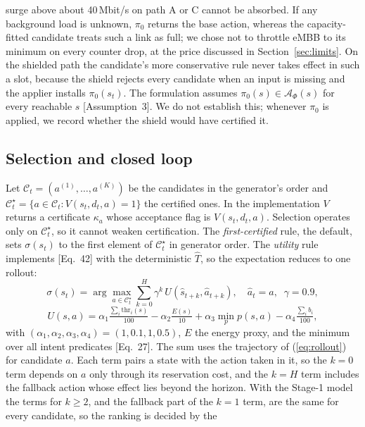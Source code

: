 \documentclass[conference]{IEEEtran}
\newcommand{\That}{\hat{T}}
\newcommand{\shat}{\hat{s}}
\newcommand{\ahat}{\hat{a}}
\newcommand{\Acal}{\mathcal{A}}
\newcommand{\Ccal}{\mathcal{C}}
\begin{document}
surge above about 40\,Mbit/s on path A or C cannot be absorbed. If any background load
is unknown, $\pi_0$ returns the base action, whereas the capacity-fitted candidate
treats such a link as full; we chose not to throttle eMBB to its minimum on every
counter drop, at the price discussed in Section~\ref{sec:limits}. On the shielded path
the candidate's more conservative rule never takes effect in such a slot, because
the shield rejects every candidate when an input is missing and the applier installs
$\pi_0(s_t)$. The formulation assumes $\pi_0(s) \in \Acal_\Phi(s)$ for every
reachable $s$ [Assumption~3]. We do not establish this; whenever $\pi_0$ is applied,
we record whether the shield would have certified it.

\subsection{Selection and closed loop}
Let $\Ccal_t = (a^{(1)},\dots,a^{(K)})$ be the candidates in the generator's order
and $\Ccal^\star_t = \{a\in\Ccal_t : V(s_t,d_t,a)=1\}$ the certified ones. In the implementation $V$ returns a certificate $\kappa_a$ whose acceptance flag is
$V(s_t,d_t,a)$. Selection operates only on $\Ccal^\star_t$, so it cannot weaken
certification. The \emph{first-certified} rule, the default, sets $\sigma(s_t)$ to the first
element of $\Ccal^\star_t$ in generator order. The
\emph{utility} rule implements [Eq.~42] with the deterministic $\That$, so the
expectation reduces to one rollout:
\begin{equation}
\sigma(s_t) = \arg\max_{a\in\Ccal^\star_t} \sum_{k=0}^{H}
\gamma^k\, U(\shat_{t+k}, \ahat_{t+k}),\quad \ahat_t = a,\;\; \gamma = 0.9,
\label{eq:select}
\end{equation}
\begin{equation}
U(s,a) = \alpha_1 \tfrac{\sum_i \mathrm{thr}_i(s)}{100} - \alpha_2 \tfrac{E(s)}{10}
 + \alpha_3 \min_{p} p(s,a) - \alpha_4 \tfrac{\sum_i b_i}{100},
\label{eq:utility}
\end{equation}
with $(\alpha_1,\alpha_2,\alpha_3,\alpha_4) = (1, 0.1, 1, 0.5)$, $E$ the energy
proxy, and the minimum over all intent predicates [Eq.~27]. The sum uses the
trajectory of (\ref{eq:rollout}) for candidate $a$. Each term pairs a state with the
action taken in it, so the $k=0$ term depends on $a$ only through its reservation
cost, and the $k=H$ term includes the fallback action whose effect lies beyond the
horizon. With the Stage-1 model the terms for $k\ge2$, and the fallback part of the
$k=1$ term, are the same for every candidate, so the ranking is decided by the
\end{document}
